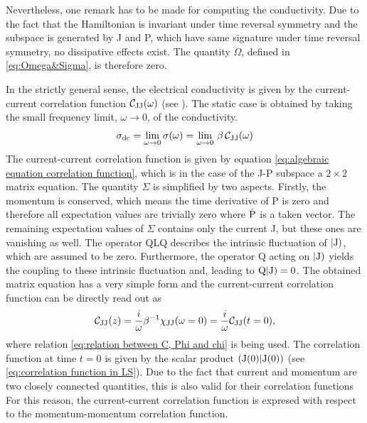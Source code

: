 Nevertheless, one remark has to be made for computing the conductivity.
Due to the fact that the Hamiltonian is invariant under time reversal symmetry and the subspace is generated by J and P, which have same signature under time reversal symmetry, no dissipative effects exist.
The quantity $\Omega$, defined in \eqref{eq:Omega&Sigma}, is therefore zero.

In the strictly general sense, the electrical conductivity is given by the current-current correlation function $\mathcal{C}_{\mathrm{JJ}}(\omega)$ (see \cite{Chycholl2}).
The static case is obtained by taking the small frequency limit, $\omega \to 0$, of the conductivity.
%
\begin{align}
	\sigma_{\mathrm{dc}} = \lim\limits_{\omega \to 0} \sigma(\omega) = \lim\limits_{\omega \to 0}\, \beta\,\mathcal{C}_{\mathrm{JJ}}(\omega)
	\label{eq:general static condictivity}
\end{align}
%
The current-current correlation function is given by equation \eqref{eq:algebraic equation correlation function}, which is in the case of the J-P subspace a $2\times2$ matrix equation.
The quantity $\Sigma$ is simplified by two aspects.
Firstly, the momentum is conserved, which means the time derivative of P is zero and therefore all expectation values are trivially zero where $\dot{\mathrm{P}}$ is a taken vector.
The remaining expectation values of $\Sigma$ contains only the current J, but these ones are vanishing as well.
The operator QLQ describes the intrinsic fluctuation of $|\mathrm{\mathrm{J}})$, which are assumed to be zero.
Furthermore, the operator Q acting on $|\mathrm{\mathrm{J}})$ yields the coupling to these intrinsic fluctuation and, leading to $\mathrm{Q}|\mathrm{\mathrm{J}}) = 0$.
The obtained matrix equation has a very simple form and the current-current correlation function can be directly read out as
%
\begin{align}
	\mathcal{C}_{\mathrm{JJ}}(z) = \frac{i}{\omega} \beta^{-1} \chi_{\mathrm{JJ}}(\omega=0) = \frac{i}{\omega} \mathcal{C}_{\mathrm{JJ}}(t=0),
	\label{eq:correlation function unpertubated system}
\end{align}
%
where relation \eqref{eq:relation between C, Phi and chi} is being used.
The correlation function at time $t = 0$ is given by the scalar product $({\mathrm{J}(0)}|{\mathrm{J}(0)})$ (see \eqref{eq:correlation function in LS}).
Due to the fact that current and momentum are two closely connected quantities, this is also valid for their correlation functions
For this reason, the current-current correlation function is expresed with respect to the momentum-momentum correlation function.


